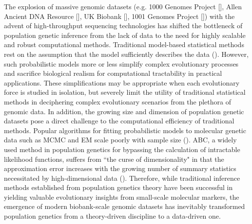 The explosion of massive genomic datasets (e.g. 1000 Genomes Project [\cite{auton_global_2015}], Allen Ancient DNA Resource [\cite{mallick2023allen}], UK Biobank [\cite{sudlow_uk_2015}], 1001 Genomes Project [\cite{alonso20161}]) with the advent of high-throughput sequencing technologies has shifted the bottleneck of population genetic inference from the lack of data to the need for highly scalable and robust computational methods. Traditional model-based statistical methods rest on the assumption that the model sufficiently describes the data (\cite{schrider_supervised_2018}). However, such probabilistic models more or less simplify complex evolutionary processes and sacrifice biological realism for computational tractability in practical applications. These simplifications may be appropriate when each evolutionary force is studied in isolation, but severely limit the utility of traditional statistical methods in deciphering complex evolutionary scenarios from the plethora of genomic data. In addition, the growing size and dimension of population genetic datasets pose a direct challenge to the computational efficiency of traditional methods. Popular algorithms for fitting probabilistic models to molecular genetic data such as \acf{MCMC} and \ac{EM} scale poorly with sample size (\cite{korfmann_deep_2023}). \Acf{ABC}, a widely used method in population genetics for bypassing the calculation of intractable likelihood functions, suffers from ``the curse of dimensionality" in that the approximation error increases with the growing number of summary statistics necessitated by high-dimensional data (\cite{prangle2018summary}). Therefore, while traditional inference methods established from population genetics theory have been successful in yielding valuable evolutionary insights from small-scale molecular markers, the emergence of modern biobank-scale genomic datasets has inevitably transformed population genetics from a theory-driven discipline to a data-driven one.

